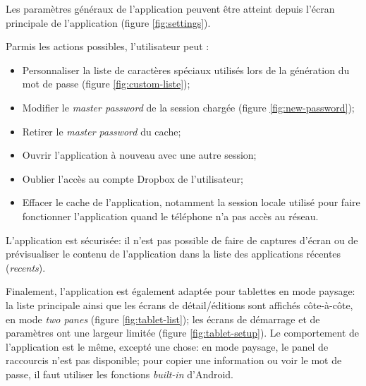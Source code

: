 Les paramètres généraux de l'application peuvent être atteint depuis l'écran principale de l'application  (figure \ref{fig:settings}). 

\begin{center}
	\begin{minipage}{.3\textwidth}
	\end{minipage}
	\begin{minipage}{.3\textwidth}
	\end{minipage}
	\begin{minipage}{.3\textwidth}
	\end{minipage}        
\end{center}

Parmis les actions possibles, l'utilisateur peut :
\begin{itemize}
	\item Personnaliser la liste de caractères spéciaux utilisés lors de la génération du mot de passe (figure \ref{fig:custom-liste});
	\item Modifier le \emph{master password} de la session chargée (figure \ref{fig:new-password});
	\item Retirer le \emph{master password} du cache;
	\item Ouvrir l'application à nouveau avec une autre session;
	\item Oublier l'accès au compte Dropbox de l'utilisateur;
	\item Effacer le cache de l'application, notamment la session locale utilisé pour faire fonctionner l'application quand le téléphone n'a pas accès au réseau.
\end{itemize}

L'application est sécurisée: il n'est pas possible de faire de captures d'écran ou de prévisualiser le contenu de l'application dans la liste des applications récentes (\emph{recents}).


Finalement, l'application est également adaptée pour tablettes en mode paysage: la liste principale ainsi que les écrans de détail/éditions sont affichés côte-à-côte, en mode \emph{two panes} (figure \ref{fig:tablet-list}); les écrans de démarrage et de paramètres ont une largeur limitée (figure \ref{fig:tablet-setup}). Le comportement de l'application est le même, excepté une chose: en mode paysage, le panel de raccourcis n'est pas disponible; pour copier une information ou voir le mot de passe, il faut utiliser les fonctions \emph{built-in} d'Android.





